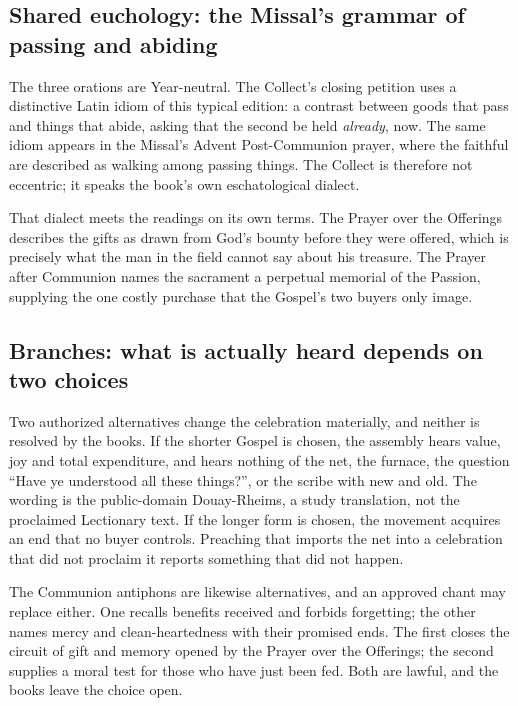 \subsection*{Shared euchology: the Missal's grammar of passing and abiding}

The three orations are Year-neutral. The Collect's closing petition uses a distinctive Latin idiom of this typical edition: a contrast between goods that pass and things that abide, asking that the second be held \emph{already}, now. The same idiom appears in the Missal's Advent Post-Communion prayer, where the faithful are described as walking among passing things. The Collect is therefore not eccentric; it speaks the book's own eschatological dialect.

That dialect meets the readings on its own terms. The Prayer over the Offerings describes the gifts as drawn from God's bounty before they were offered, which is precisely what the man in the field cannot say about his treasure. The Prayer after Communion names the sacrament a perpetual memorial of the Passion, supplying the one costly purchase that the Gospel's two buyers only image.

\subsection*{Branches: what is actually heard depends on two choices}

Two authorized alternatives change the celebration materially, and neither is resolved by the books. If the shorter Gospel is chosen, the assembly hears value, joy and total expenditure, and hears nothing of the net, the furnace, the question ``Have ye understood all these things?'', or the scribe with new and old. The wording is the public-domain Douay-Rheims, a study translation, not the proclaimed Lectionary text. If the longer form is chosen, the movement acquires an end that no buyer controls. Preaching that imports the net into a celebration that did not proclaim it reports something that did not happen.

The Communion antiphons are likewise alternatives, and an approved chant may replace either. One recalls benefits received and forbids forgetting; the other names mercy and clean-heartedness with their promised ends. The first closes the circuit of gift and memory opened by the Prayer over the Offerings; the second supplies a moral test for those who have just been fed. Both are lawful, and the books leave the choice open.

